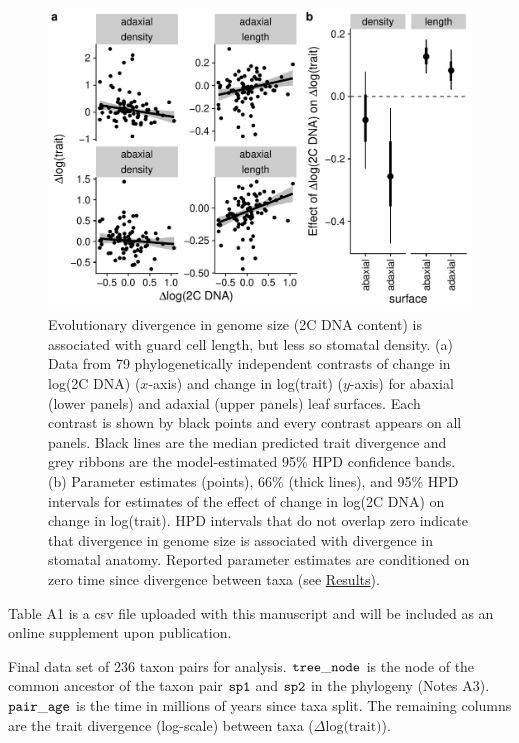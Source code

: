 \documentclass[
  12pt,
]{article}
\begin{document}
\begin{figure}[ht]
\includegraphics[width=\textwidth]{../figures/genome.pdf}
\caption{Evolutionary divergence in genome size (2C DNA content) is associated with guard cell length, but less so stomatal density. (a) Data from 79 phylogenetically independent contrasts of change in log(2C DNA) ($x$-axis) and change in log(trait) ($y$-axis) for abaxial (lower panels) and adaxial (upper panels) leaf surfaces. Each contrast is shown by black points and every contrast appears on all panels. Black lines are the median predicted trait divergence and grey ribbons are the model-estimated 95\% HPD confidence bands. (b) Parameter estimates (points), 66\% (thick lines), and 95\% HPD intervals for estimates of the effect of change in log(2C DNA) on change in log(trait). HPD intervals that do not overlap zero indicate that divergence in genome size is associated with divergence in stomatal anatomy. Reported parameter estimates are conditioned on zero time since divergence between taxa (see \protect\hyperlink{results}{Results}).}
  \label{fig:genome}
\end{figure}

\clearpage

\begin{center}
  Table A1 is a csv file uploaded with this manuscript and will be included as an online supplement upon publication.
\end{center}

\begin{table}
\caption{\label{tab:pair_div}Final data set of 236 taxon pairs for analysis. $\tt{tree\_node}$ is the node of the common ancestor of the taxon pair $\tt{sp1}$ and $\tt{sp2}$ in the phylogeny (Notes A3). $\tt{pair\_age}$ is the time in millions of years since taxa split. The remaining columns are the trait divergence (log-scale) between taxa ($\Delta \text{log(trait)}$).}
\end{table}
\end{document}
